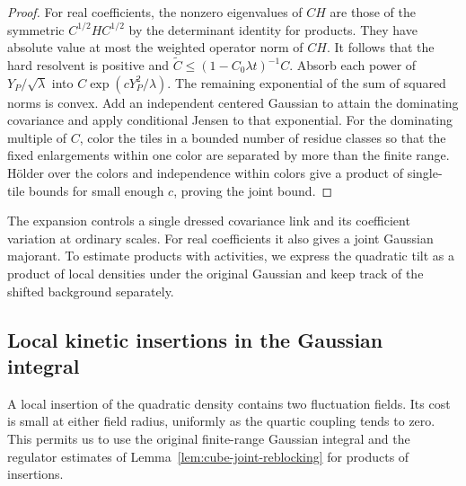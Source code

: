 \documentclass[11pt]{article}
\theoremstyle{definition}
\begin{document}
\begin{proof}
For real coefficients, the nonzero eigenvalues of \(CH\)
are those of the symmetric \(C^{1/2}HC^{1/2}\) by the
determinant identity for products. They have absolute value
at most the weighted operator norm of \(CH\). It follows
that the hard resolvent is positive and
\(\widetilde C\le (1-C_0\lambda t)^{-1}C\).
Absorb each power of \(Y_P/\sqrt\lambda\) into
\(C\exp(cY_P^2/\lambda)\). The remaining exponential of the
sum of squared norms is convex. Add an independent centered
Gaussian to attain the dominating covariance and apply
conditional Jensen to that exponential. For the dominating
multiple of \(C\), color the tiles in a bounded number of
residue classes so that the fixed enlargements within one
color are separated by more than the finite range. Hölder
over the colors and independence within colors give a product
of single-tile bounds for small enough \(c\), proving the
joint bound.
\end{proof}

The expansion controls a single dressed covariance link and its
coefficient variation at ordinary scales. For real coefficients it
also gives a joint Gaussian majorant. To estimate products with
activities, we express the quadratic tilt as a product of local
densities under the original Gaussian and keep track of the shifted
background separately.

\subsection{Local kinetic insertions in the Gaussian integral}
\label{sec:kinetic-density}

A local insertion of the quadratic density contains two fluctuation
fields. Its cost is small at either field radius, uniformly as the
quartic coupling tends to zero. This permits us to use the original
finite-range Gaussian integral and the regulator estimates of
Lemma~\ref{lem:cube-joint-reblocking} for products of insertions.
\end{document}
